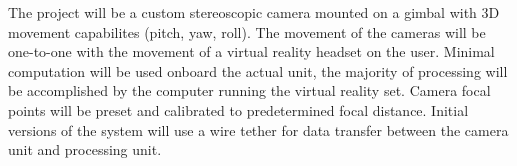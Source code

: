 The project will be a custom stereoscopic camera mounted on a gimbal with 3D movement capabilites (pitch, yaw, roll). The movement of the cameras will be one-to-one with the movement of a virtual reality headset on the user. Minimal computation will be used onboard the actual unit, the majority of processing will be accomplished by the computer running the virtual reality set. Camera focal points will be preset and calibrated to predetermined focal distance. Initial versions of the system will use a wire tether for data transfer between the camera unit and processing unit.